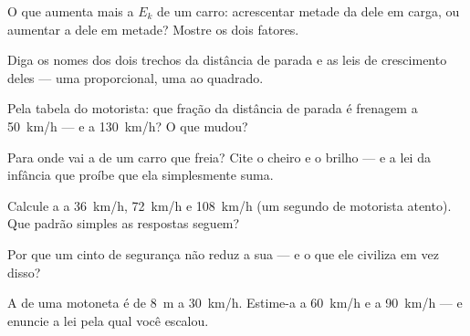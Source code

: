 \begin{exercise}[$\star$]\label{exo:g9:kinetic-energy-safety:3}
O que aumenta mais a $E_k$ de um carro: acrescentar metade da 
dele em carga, ou aumentar a  dele em metade? Mostre os
dois fatores.
\end{exercise}

\begin{exercise}[$\star$]\label{exo:g9:kinetic-energy-safety:4}
Diga os nomes dos dois trechos da distância de parada e as leis de
crescimento deles --- uma proporcional, uma ao quadrado.
\end{exercise}

\begin{exercise}[$\star$]\label{exo:g9:kinetic-energy-safety:5}
Pela tabela do motorista: que fração da distância de parada é
frenagem a \qty{50}{km/h} --- e a \qty{130}{km/h}? O que mudou?
\end{exercise}

\begin{exercise}[$\star$]\label{exo:g9:kinetic-energy-safety:6}
Para onde vai a  de um carro que freia? Cite o cheiro
e o brilho --- e a lei da infância que proíbe que ela simplesmente
suma.
\end{exercise}

\begin{exercise}[$\star$]\label{exo:g9:kinetic-energy-safety:7}
Calcule a  a \qty{36}{km/h}, \qty{72}{km/h} e
\qty{108}{km/h} (um segundo de motorista atento). Que padrão simples
as respostas seguem?
\end{exercise}

\begin{exercise}[$\star$]\label{exo:g9:kinetic-energy-safety:8}
Por que um cinto de segurança não reduz a sua  --- e
o que ele civiliza em vez disso?
\end{exercise}

\begin{exercise}[$\star\star$]\label{exo:g9:kinetic-energy-safety:9}
A  de uma motoneta é de \qty{8}{m} a
\qty{30}{km/h}. Estime-a a \qty{60}{km/h} e a \qty{90}{km/h} --- e
enuncie a lei pela qual você escalou.
\end{exercise}

